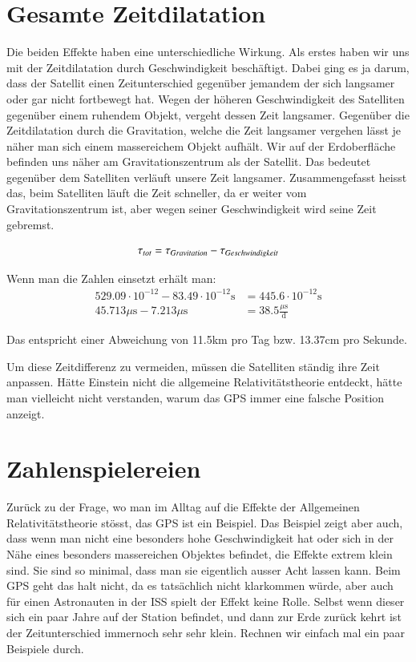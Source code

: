 \begin{refsection}
\section{Gesamte Zeitdilatation}
Die beiden Effekte haben eine unterschiedliche Wirkung. Als erstes haben wir uns mit der Zeitdilatation durch Geschwindigkeit beschäftigt. Dabei ging es ja darum, dass der Satellit einen Zeitunterschied gegenüber jemandem der sich langsamer oder gar nicht fortbewegt hat. Wegen der höheren Geschwindigkeit des Satelliten gegenüber einem ruhendem Objekt, vergeht dessen Zeit langsamer. Gegenüber die Zeitdilatation durch die Gravitation, welche die Zeit langsamer vergehen lässt je näher man sich einem massereichem Objekt aufhält. Wir auf der Erdoberfläche befinden uns näher am Gravitationszentrum als der Satellit. Das bedeutet gegenüber dem Satelliten verläuft unsere Zeit langsamer. Zusammengefasst heisst das, beim Satelliten läuft die Zeit schneller, da er weiter vom Gravitationszentrum ist, aber wegen seiner Geschwindigkeit wird seine Zeit gebremst.

\begin{equation}
\tau_{tot} = \tau_{Gravitation} - \tau_{Geschwindigkeit}\\
\end{equation}

\noindent{}Wenn man die Zahlen einsetzt erhält man:
\begin{align*}
529.09 \cdot 10^{-12}  -  83.49 \cdot 10^{-12}\text{s} &=  445.6 \cdot 10^{-12}\text{s}
\\
45.713\mu{}\text{s} - 7.213\mu{}\text{s} &= 38.5\frac{\mu{}\text{s}}{\text{d}}
\end{align*}

\noindent{}Das entspricht einer Abweichung von 11.5km pro Tag bzw. 13.37cm pro Sekunde. 

Um diese Zeitdifferenz zu vermeiden, müssen die Satelliten ständig ihre Zeit anpassen. Hätte Einstein nicht die allgemeine Relativitätstheorie entdeckt, hätte man vielleicht nicht verstanden, warum das GPS immer eine falsche Position anzeigt. 

\section{Zahlenspielereien}
Zurück zu der Frage, wo man im Alltag auf die Effekte der Allgemeinen Relativitätstheorie stösst, das GPS ist ein Beispiel. Das Beispiel zeigt aber auch, dass wenn man nicht eine besonders hohe Geschwindigkeit hat oder sich in der Nähe eines besonders massereichen Objektes befindet, die Effekte extrem klein sind. Sie sind so minimal, dass man sie eigentlich ausser Acht lassen kann. Beim GPS geht das halt nicht, da es tatsächlich nicht klarkommen würde, aber auch für einen Astronauten in der ISS spielt der Effekt keine Rolle. Selbst wenn dieser sich ein paar Jahre auf der Station befindet, und dann zur Erde zurück kehrt ist der Zeitunterschied immernoch sehr sehr klein. Rechnen wir einfach mal ein paar Beispiele durch.


\end{refsection}
